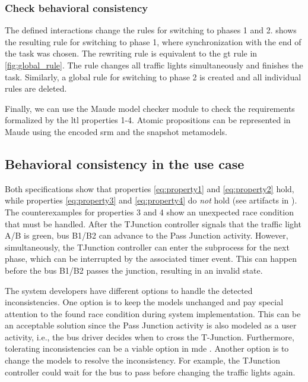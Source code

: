\documentclass{jot}
\begin{document}
\subsubsection{Check behavioral consistency}
The defined interactions change the rules for switching to phases 1 and 2.
 shows the resulting rule for switching to phase 1, where synchronization with the end of the task was chosen.
The rewriting rule is equivalent to the \gls*{gt} rule in \cref{fig:global_rule}.
The rule changes all traffic lights simultaneously and finishes the task.
Similarly, a global rule for switching to phase 2 is created and all individual rules are deleted.



Finally, we can use the Maude model checker module to check the requirements formalized by the \gls*{ltl} properties 1-4.
Atomic propositions can be represented in Maude using the encoded \gls*{srm} and the snapshot metamodels.


\subsection{Behavioral consistency in the use case}
Both specifications show that properties \eqref{eq:property1} and \eqref{eq:property2} hold, while properties \eqref{eq:property3} and \eqref{eq:property4} do \emph{not} hold (see artifacts in \cite{krauterArtifactsBehavioralConsistency2022}).
The counterexamples for properties 3 and 4 show an unexpected race condition that must be handled.
After the TJunction controller signals that the traffic light A/B is green, bus B1/B2 can advance to the \textsf{Pass Junction} activity.
However, simultaneously, the TJunction controller can enter the subprocess for the next phase, which can be interrupted by the associated timer event.
This can happen before the bus B1/B2 passes the junction, resulting in an invalid state.

The system developers have different options to handle the detected inconsistencies.
One option is to keep the models unchanged and pay special attention to the found race condition during system implementation.
This can be an acceptable solution since the \textsf{Pass Junction} activity is also modeled as a user activity, i.e., the bus driver decides when to cross the T-Junction.
Furthermore, tolerating inconsistencies can be a viable option in \gls*{mde} \cite{weidmannToleranceModelDrivenEngineering2021}.
Another option is to change the models to resolve the inconsistency.
For example, the TJunction controller could wait for the bus to pass before changing the traffic lights again.
\end{document}
